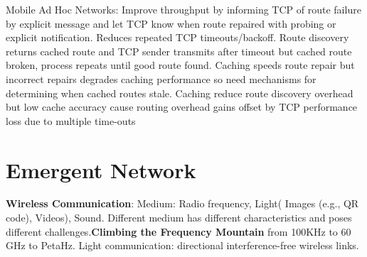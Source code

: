 \documentclass[8pt]{extarticle}
\begin{document}
\begin{multicols}{2}
Mobile Ad Hoc Networks: Improve throughput by informing TCP of route failure by explicit message and let TCP know when route repaired with probing or explicit notification. Reduces repeated TCP timeouts/backoff. Route discovery returns cached route and TCP sender transmits after timeout but cached route broken, process repeats until good route found. Caching speeds route repair but incorrect repairs degrades caching performance so need mechanisms for determining when cached routes stale. Caching reduce route discovery overhead but low cache accuracy cause routing overhead gains offset by TCP performance loss due to multiple time-outs
\section{Emergent Network}
\textbf{Wireless Communication}: Medium: Radio frequency, Light( Images (e.g., QR code), Videos), Sound. Different medium has different characteristics and poses different challenges.\textbf{Climbing the Frequency Mountain} from 100KHz to 60 GHz to PetaHz. Light communication: directional interference-free wireless links. 


\end{multicols}
\end{document}
